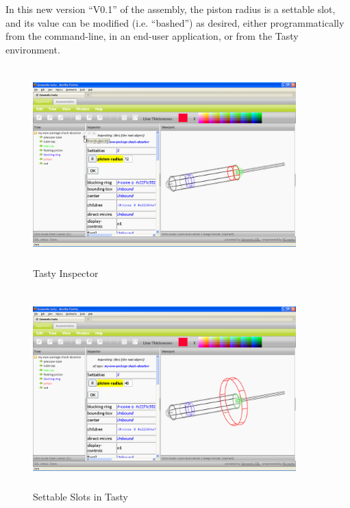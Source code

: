 \documentclass [11pt]{book}
\begin{document}
In this new version ``V0.1'' of the assembly, the piston radius is a
settable slot, and its value can be modified (i.e. ``bashed'') as
desired, either programmatically from the command-line, in an end-user
application, or from the Tasty environment.


\begin{figure}
\begin{center}
\includegraphics[width=4in,height=3in]{../images/tasty-inspector.png}
\end{center}

\caption{Tasty Inspector}

\label{fig:tasty-inspector}

\end{figure}

\begin{figure}
\begin{center}
\includegraphics[width=4in,height=3in]{../images/tasty-s-slots.png}
\end{center}

\caption{Settable Slots in Tasty}

\label{fig:tasty-s-slots}

\end{figure}
\end{document}
